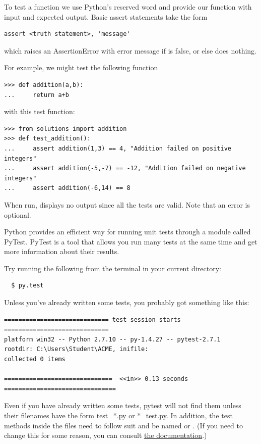 To test a function we use Python's reserved word  and provide our function with input and expected output. Basic assert statements take the form

\begin{lstlisting}
assert <truth statement>, 'message'
\end{lstlisting}

which raises an AssertionError with error message  if  is false, or else does nothing.

For example, we might test the following function

\begin{lstlisting}
>>> def addition(a,b):
...     return a+b
\end{lstlisting}

with this test function:

\begin{lstlisting}
>>> from solutions import addition
>>> def test_addition():
...     assert addition(1,3) == 4, "Addition failed on positive integers"
...     assert addition(-5,-7) == -12, "Addition failed on negative integers"
...     assert addition(-6,14) == 8
\end{lstlisting}

When run,  displays no output since all the tests are valid. Note that an error is optional.

Python provides an efficient way for running unit tests through a module called PyTest. PyTest is a tool that allows you run many tests at the same time and get more information about their results.


Try running the following from the terminal in your current directory:

\begin{lstlisting}
  $ py.test
\end{lstlisting}

Unless you've already written some tests, you probably got something like this:

\begin{lstlisting}
============================= test session starts =============================
platform win32 -- Python 2.7.10 -- py-1.4.27 -- pytest-2.7.1
rootdir: C:\Users\Student\ACME, inifile:
collected 0 items

==============================  <<in>> 0.13 seconds ===============================
\end{lstlisting}


Even if you have already written some tests, pytest will not find them unless their filenames have the form test\_*.py or *\_test.py.  In addition, the test methods inside the files need to follow suit and be named  or .  (If you need to change this for some reason, you can consult \href{http://pytest.org/latest/example/pythoncollection.html} {the documentation}.)


